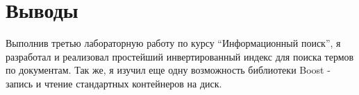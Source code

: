 \section{Выводы}

Выполнив третью лабораторную работу по курсу \enquote{Информационный поиск}, я разработал и реализовал простейший инвертированный индекс для поиска термов по документам. Так же, я изучил еще одну возможность библиотеки Boost - запись и чтение стандартных контейнеров на диск.

\pagebreak
